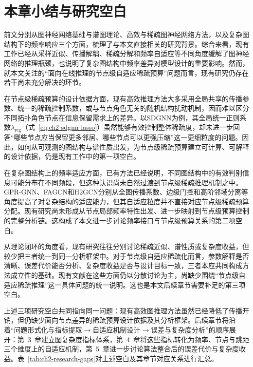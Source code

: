 \section{本章小结与研究空白}
\label{sec:ch2-summary}

前文分别从图神经网络基础与谱图理论、高效与稀疏图神经网络方法，以及复杂图结构下的频率响应三个方面，梳理了与本文直接相关的研究背景。综合来看，现有工作已经从采样近似、传播解耦、稀疏分解和频率自适应等不同角度缓解了图神经网络的推理瓶颈，也说明了复杂图结构中频率差异对模型设计的重要影响。然而，就本文关注的“面向在线推理的节点级自适应稀疏预算”问题而言，现有研究仍存在若干尚未充分解决的环节。

在节点级稀疏预算的设计依据方面，现有高效推理方法大多采用全局共享的传播参数、统一的稀疏控制系数，或与节点角色无关的随机结构扰动机制，因而难以区分不同拓扑角色节点在信息保留需求上的差异。以SDGNN为例，其全局统一正则系数$\lambda_{\mathrm{reg}}$（式~\eqref{eq:ch2-sdgnn-lasso}）虽然能够有效控制整体稀疏度，却未进一步回答“哪些节点应当保留更多邻居、哪些节点可以更强压缩”这一更细粒度的问题。因此，如何从可观测的图结构与谱性质出发，为节点级稀疏预算建立可计算、可解释的设计依据，仍是现有工作中的第一项空白。

在复杂图结构上的频率适应方面，已有方法已经说明，不同图结构中的有效判别信息可能分布在不同频段，但这种认识尚未自然过渡到节点级稀疏推理机制之中。GPR-GNN、FAGCN和H2GCN分别从全图传播系数、边级门控和高阶邻域分离等角度提高了对复杂结构的适应能力，但其自适应粒度并不直接对应节点级稀疏预算分配。现有研究尚未形成从节点局部频率特性出发、进一步映射到节点级预算控制的完整分析链。这构成了本文进一步讨论频率接口与节点级预算关系的第二项空白。

从理论闭环的角度看，现有研究往往分别讨论稀疏近似、谱性质或复杂度收益，但较少把三者统一到同一分析框架中。对于节点级自适应稀疏化而言，参数解释是否清晰、误差代价能否分析、复杂度收益是否与设计目标一致，三者本应共同构成方法成立性的基础。现有文献在这些方面仍以分散讨论为主，尚缺少围绕“节点级自适应稀疏推理”这一具体问题的统一说明。这也是本文后续章节需要补足的第三项空白。

上述三项研究空白共同指向同一问题：现有高效图推理方法虽然已经降低了传播开销，但仍缺少面向节点差异的稀疏预算设计依据及其分析框架。后续章节将沿着“问题形式化与指标提取$\rightarrow$自适应机制设计$\rightarrow$误差与复杂度分析”的顺序展开：第~3~章建立图复杂度指标体系，第~4~章将这些指标转化为频率、节点与跳距三个维度上的自适应机制，第~5~章进一步讨论算法整合后的误差代价与复杂度收益。表~\ref{tab:ch2-research-gaps}对上述空白及其章节对应关系进行汇总。

